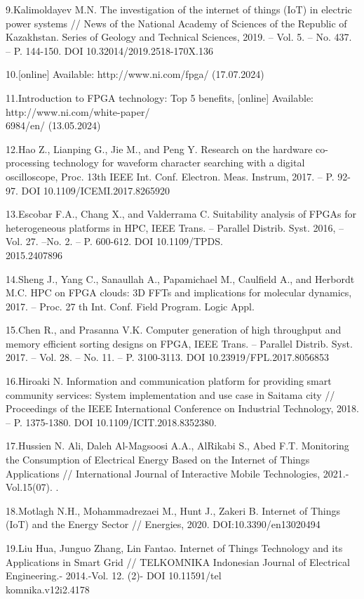 \begin{noparindent}
9.Kalimoldayev M.N. The investigation of the internet of things (IoT) in
electric power systems // News of the National Academy of Sciences of
the Republic of Kazakhstan. Series of Geology and Technical Sciences,
2019. -- Vol. 5. -- No. 437. -- P. 144-150. DOI
10.32014/2019.2518-170X.136

10.{[}online{]} Available: http://www.ni.com/fpga/ (17.07.2024)

11.Introduction to FPGA technology: Top 5 benefits, {[}online{]}
Available: http://www.ni.com/white-paper/\\6984/en/ (13.05.2024)

12.Hao Z., Lianping G., Jie M., and Peng Y. Research on the hardware
co-processing technology for waveform character searching with a digital
oscilloscope, Proc. 13th IEEE Int. Conf. Electron. Meas. Instrum, 2017.
-- P. 92-97. DOI 10.1109/ICEMI.2017.8265920

13.Escobar F.A., Chang X., and Valderrama C. Suitability analysis of
FPGAs for heterogeneous platforms in HPC, IEEE Trans. -- Parallel
Distrib. Syst. 2016, -- Vol. 27. --No. 2. -- P. 600-612. DOI 10.1109/TPDS.\\2015.2407896

14.Sheng J., Yang C., Sanaullah A., Papamichael M., Caulfield A., and
Herbordt M.C. HPC on FPGA clouds: 3D FFTs and implications for molecular
dynamics, 2017. -- Proc. 27 th Int. Conf. Field Program. Logic Appl.

15.Chen R., and Prasanna V.K. Computer generation of high throughput and
memory efficient sorting designs on FPGA, IEEE Trans. -- Parallel
Distrib. Syst. 2017. -- Vol. 28. -- No. 11. -- P. 3100-3113. DOI
10.23919/FPL.2017.8056853

16.Hiroaki N. Information and communication platform for providing smart
community services: System implementation and use case in Saitama city
// Proceedings of the IEEE International Conference on Industrial
Technology, 2018. -- P. 1375-1380. DOI 10.1109/ICIT.2018.8352380.

17.Hussien N. Ali, Daleh Al-Magsoosi A.A., AlRikabi S., Abed F.T.
Monitoring the Consumption of Electrical Energy Based on the Internet of
Things Applications // International Journal of Interactive Mobile
Technologies, 2021.-Vol.15(07). .

18.Motlagh N.H., Mohammadrezaei M., Hunt J., Zakeri B. Internet of
Things (IoT) and the Energy Sector // Energies, 2020.
DOI:10.3390/en13020494

19.Liu Hua, Junguo Zhang, Lin Fantao. Internet of Things Technology and
its Applications in Smart Grid // TELKOMNIKA Indonesian Journal of
Electrical Engineering.- 2014.-Vol. 12. (2)- DOI
10.11591/tel\\komnika.v12i2.4178


\end{noparindent}
